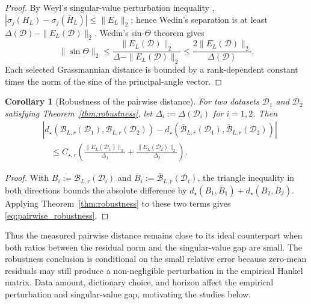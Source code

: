 \documentclass[letterpaper, 10 pt, conference]{ieeeconf}  %
\newtheorem{corollary}{Corollary}
\begin{document}
\begin{proof}
By Weyl's singular-value perturbation inequality \cite{horn1991topics}, $|\sigma_j(H_L)-\sigma_j(\bar H_L)|\leq\|E_L\|_2$; hence Wedin's separation is at least $\Delta(\mathcal D)-\|E_L(\mathcal D)\|_2$. Wedin's sin-$\Theta$ theorem \cite[Thm.~4.1]{wedin1972perturbation} gives
\[
  \|\sin\Theta\|_2\leq\frac{\|E_L(\mathcal D)\|_2}{\Delta-\|E_L(\mathcal D)\|_2}
  \leq\frac{2\|E_L(\mathcal D)\|_2}{\Delta(\mathcal D)}.
\]
Each selected Grassmannian distance is bounded by a rank-dependent constant times the norm of the sine of the principal-angle vector.
\end{proof}

\begin{corollary}[Robustness of the pairwise distance]
\label{cor:pairwise_robustness}
For two datasets $\mathcal D_1$ and $\mathcal D_2$ satisfying Theorem~\ref{thm:robustness}, let $\Delta_i:=\Delta(\mathcal D_i)$ for $i=1,2$. Then
\begin{equation}
    \begin{aligned}
    &\left|d_\star(\mathcal B_{L,r}(\mathcal D_1),\mathcal B_{L,r}(\mathcal D_2))
    -d_\star(\bar{\mathcal B}_{L,r}(\mathcal D_1),\bar{\mathcal B}_{L,r}(\mathcal D_2))\right|\\
    &\quad\leq C_{\star,r}\left(
    \frac{\|E_L(\mathcal D_1)\|_2}{\Delta_1}+
    \frac{\|E_L(\mathcal D_2)\|_2}{\Delta_2}\right).
    \end{aligned}
    \label{eq:pairwise_robustness}
\end{equation}
\end{corollary}
\begin{proof}
With $B_i:=\mathcal B_{L,r}(\mathcal D_i)$ and $\bar B_i:=\bar{\mathcal B}_{L,r}(\mathcal D_i)$, the triangle inequality in both directions bounds the absolute difference by $d_\star(B_1,\bar B_1)+d_\star(B_2,\bar B_2)$. Applying Theorem~\ref{thm:robustness} to these two terms gives \eqref{eq:pairwise_robustness}.
\end{proof}

Thus the measured pairwise distance remains close to its ideal counterpart when both ratios between the residual norm and the singular-value gap are small. The robustness conclusion is conditional on the small relative error because zero-mean residuals may still produce a non-negligible perturbation in the empirical Hankel matrix.
Data amount, dictionary choice, and horizon affect the empirical perturbation and singular-value gap, motivating the studies below.
\end{document}
